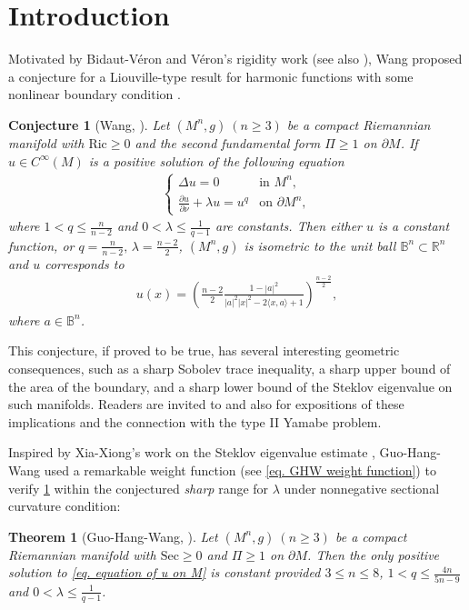 \documentclass[12pt]{amsart}%
\newtheorem{theorem}{Theorem}
\newtheorem{conjecture}{Conjecture}
\numberwithin{equation}{section}
\numberwithin{lemma}{section}
\numberwithin{proposition}{section}
\numberwithin{corollary}{section}
\numberwithin{remark}{section}
\begin{document}
\section{Introduction}
Motivated by Bidaut-V\'eron and V\'eron's rigidity work \cite[Theorem 6.1]{BVV91} (see also \cite{Ili96}), Wang proposed a conjecture for a Liouville-type result for harmonic functions with some nonlinear boundary condition \cite[Conjecture 1]{Wan21}.  
\begin{conjecture}[Wang, \cite{Wan21}]\label{conj. Wang}
    Let $(M^n,g)\ (n\geq 3)$ be a compact Riemannian manifold with $\mathrm{Ric}\geq 0$ and the second fundamental form $\Pi\geq 1$ on $\partial M$. If $u\in C^{\infty}(M)$ is a positive solution of the following equation
    \begin{align}\label{eq. equation of u on M}
        \begin{cases}
            \Delta u=0  &\text{in }M^n,\\
            \frac{\partial u}{\partial \nu}+\lambda u=u^q &\text{on }\partial M^n,
        \end{cases}
    \end{align}
    where $1<q\leq \frac{n}{n-2}$ and $0<\lambda\leq \frac{1}{q-1}$ are constants. Then either $u$ is a constant function, or $q=\frac{n}{n-2},\, \lambda=\frac{n-2}{2}$, $(M^n,g)$ is isometric to the unit ball $\mathbb{B}^n\subset\mathbb{R}^n$ and $u$ corresponds to
    \begin{align}\label{eq. model solution}
            u(x)=\left(
            \frac{n-2}{2}\frac{1-|a|^2}{|a|^2|x|^2-2\langle x,a\rangle+1}
            \right)^{\frac{n-2}{2}},
        \end{align}
        where $a\in \mathbb{B}^n$.
\end{conjecture}
This conjecture, if proved to be true, has several interesting geometric consequences, such as a sharp Sobolev trace inequality, a sharp upper bound of the area of the boundary, and a sharp lower bound of the Steklov eigenvalue on such manifolds. Readers are invited to \cite[Section 2]{Wan21} and also \cite[Section 5]{GHW21} for expositions of these implications and the connection with the type II Yamabe problem.

Inspired by Xia-Xiong's work on the Steklov eigenvalue estimate \cite{XX24}, Guo-Hang-Wang \cite[Theorem 2]{GHW21} used a remarkable weight function (see \cref{eq. GHW weight function}) to verify \cref{conj. Wang} within the conjectured \emph{sharp} range for $\lambda$ under nonnegative sectional curvature condition:
\begin{theorem}[Guo-Hang-Wang, \cite{GHW21}]\label{thm. GHW21}
    Let $(M^n,g)\ (n\geq 3)$ be a compact Riemannian manifold with $\mathrm{Sec}\geq 0$ and $\Pi\geq 1$ on $\partial M$. Then the only positive solution to \cref{eq. equation of u on M} is constant provided $3\leq n\leq 8$, 
    $1<q\leq \frac{4n}{5n-9}$ and $0<\lambda\leq \frac{1}{q-1}$.
\end{theorem}
\end{document}
